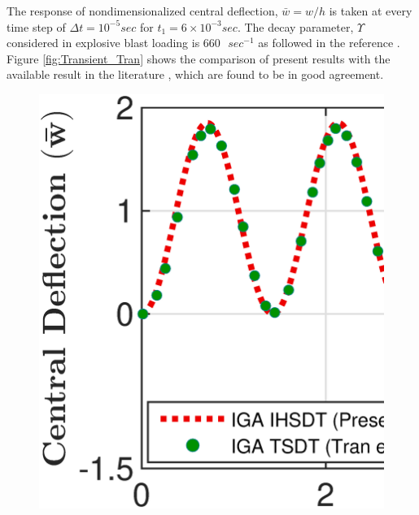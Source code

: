 \documentclass[3p,preprint,12pt]{elsarticle}
\begin{document}
The response of nondimensionalized central deflection, $\bar{w}=w/h$ is taken at every time step of $\Delta t=10^{-5} sec$ for $t_{1}=6 \times 10^{-3} sec$. The decay parameter, $\Upsilon$ considered in explosive blast loading is $660 \text{ } sec^{-1}$ as followed in the reference \cite{tran2015geometrically}. Figure \ref{fig:Transient_Tran} shows the comparison of present results with the available result in the literature \cite{tran2015geometrically}, which are found to be in good agreement.

\begin{figure}
	\centering
	\begin{minipage}{0.515\textwidth}
		\graphicspath{{./All_Images/}}
		\centering
		\includegraphics[width=\linewidth]{Tran_Step_NPSDT_Transient_h_By_a_1_5.eps}\\
	\end{minipage}\\
	\begin{minipage}{0.515\textwidth}
		\graphicspath{{./All_Images/}}
		\centering

\end{minipage}
\end{figure}
\end{document}
